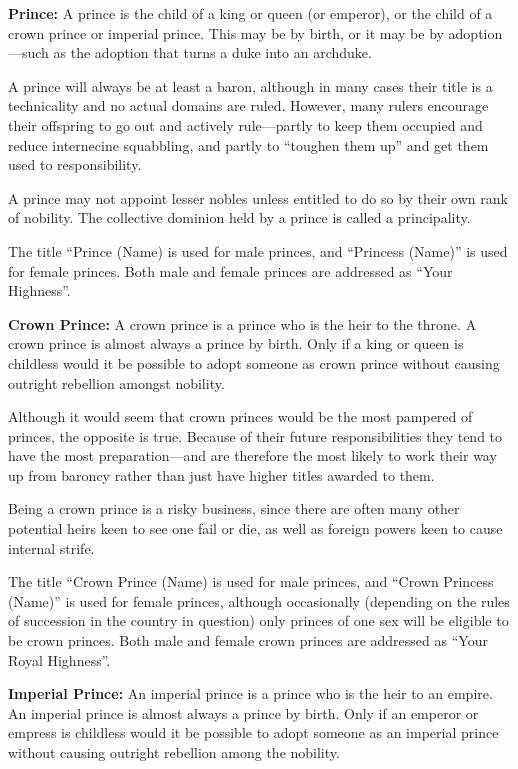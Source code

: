 \begin{multicols*}{2}
\textbf{Prince:} A prince is the child of a king or queen (or emperor), or the child of a crown prince or imperial prince. This may be by birth, or it may be by adoption—such as the adoption that turns a duke into an archduke.

A prince will always be at least a baron, although in many cases their title is a technicality and no actual domains are ruled. However, many rulers encourage their offspring to go out and actively rule—partly to keep them occupied and reduce internecine squabbling, and partly to “toughen them up” and get them used to responsibility.

A prince may not appoint lesser nobles unless entitled to do so by their own rank of nobility. The collective dominion held by a prince is called a principality.

The title “Prince (Name) is used for male princes, and “Princess (Name)” is used for female princes. Both male and female princes are addressed as “Your Highness”.

\textbf{Crown Prince:} A crown prince is a prince who is the heir to the throne. A crown prince is almost always a prince by birth. Only if a king or queen is childless would it be possible to adopt someone as crown prince without causing outright rebellion amongst nobility.

Although it would seem that crown princes would be the most pampered of princes, the opposite is true. Because of their future responsibilities they tend to have the most preparation—and are therefore the most likely to work their way up from baroncy rather than just have higher titles awarded to them.

Being a crown prince is a risky business, since there are often many other potential heirs keen to see one fail or die, as well as foreign powers keen to cause internal strife.

The title “Crown Prince (Name) is used for male princes, and “Crown Princess (Name)” is used for female princes, although occasionally (depending on the rules of succession in the country in question) only princes of one sex will be eligible to be crown princes. Both male and female crown princes are addressed as “Your Royal Highness”.

\textbf{Imperial Prince:} An imperial prince is a prince who is the heir to an empire. An imperial prince is almost always a prince by birth. Only if an emperor or empress is childless would it be possible to adopt someone as an imperial prince without causing outright rebellion among the nobility.


\end{multicols*}
